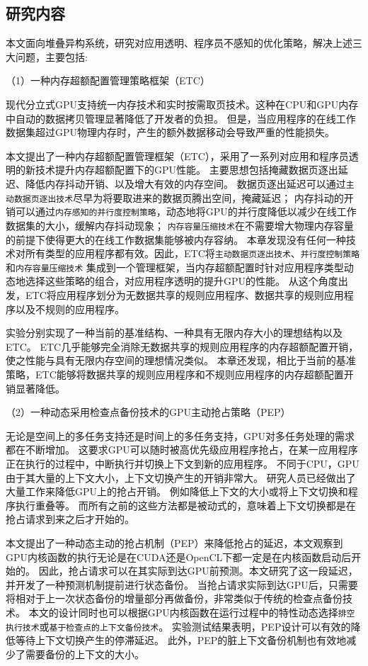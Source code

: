 \subsection{研究内容}
本文面向堆叠异构系统，研究对应用透明、程序员不感知的优化策略，解决上述三大问题，主要包括:

（1）一种内存超额配置管理策略框架（ETC）

现代分立式GPU支持统一内存技术和实时按需取页技术。这种在CPU和GPU内存中自动的数据拷贝管理显著降低了开发者的负担。
但是，当应用程序的在线工作数据集超过GPU物理内存时，产生的额外数据移动会导致严重的性能损失。

本文提出了一种内存超额配置管理框架（ETC），采用了一系列对应用和程序员透明的新技术提升内存超额配置下的GPU性能。
主要思想包括掩藏数据页逐出延迟、降低内存抖动开销、以及增大有效的内存空间。
数据页逐出延迟可以通过\texttt{主动数据页逐出技术}尽早为将要取进来的数据页腾出空间，掩藏延迟；
内存抖动的开销可以通过\texttt{内存感知的并行度控制策略}，动态地将GPU的并行度降低以减少在线工作数据集的大小，缓解内存抖动现象；
\texttt{内存容量压缩技术}在不需要增大物理内存容量的前提下使得更大的在线工作数据集能够被内存容纳。
本章发现没有任何一种技术对所有类型的应用程序都有效。因此，ETC将\texttt{主动数据页逐出技术}、\texttt{并行度控制策略}和\texttt{内存容量压缩技术}
集成到一个管理框架，当内存超额配置时针对应用程序类型动态地选择这些策略的组合，对应用程序透明的提升GPU的性能。
从这个角度出发，ETC将应用程序划分为无数据共享的规则应用程序、数据共享的规则应用程序以及不规则的应用程序。

实验分别实现了一种当前的基准结构、一种具有无限内存大小的理想结构以及ETC。
ETC几乎能够完全消除无数据共享的规则应用程序的内存超额配置开销，使之性能与具有无限内存空间的理想情况类似。
本章还发现，相比于当前的基准策略，ETC能够将数据共享的规则应用程序和不规则应用程序的内存超额配置开销显著降低。

（2）一种动态采用检查点备份技术的GPU主动抢占策略（PEP）

无论是空间上的多任务支持还是时间上的多任务支持，GPU对多任务处理的需求都在不断增加。
这要求GPU可以随时被高优先级应用程序抢占，在某一应用程序正在执行的过程中，中断执行并切换上下文到新的应用程序。
不同于CPU，GPU由于其大量的上下文大小，上下文切换产生的开销非常大。
研究人员已经做出了大量工作来降低GPU上的抢占开销。
例如降低上下文的大小或将上下文切换和程序执行重叠等。
而所有之前的这些方法都是被动式的，意味着上下文切换都是在抢占请求到来之后才开始的。

本文提出了一种动态主动的抢占机制（PEP）来降低抢占的延迟，本文观察到GPU内核函数的执行无论是在CUDA还是OpenCL下都一定是在内核函数启动后开始的。
因此，抢占请求可以在其实际到达GPU前预测。本文研究了这一段延迟，并开发了一种预测机制提前进行状态备份。
当抢占请求实际到达GPU后，只需要将相对于上一次状态备份的增量部分再做备份，非常类似于传统的检查点备份技术。
本文的设计同时也可以根据GPU内核函数在运行过程中的特性动态选择\texttt{排空执行技术}或\texttt{基于检查点的上下文备份技术}。
实验测试结果表明，PEP设计可以有效的降低等待上下文切换产生的停滞延迟。
此外，PEP的脏上下文备份机制也有效地减少了需要备份的上下文的大小。

